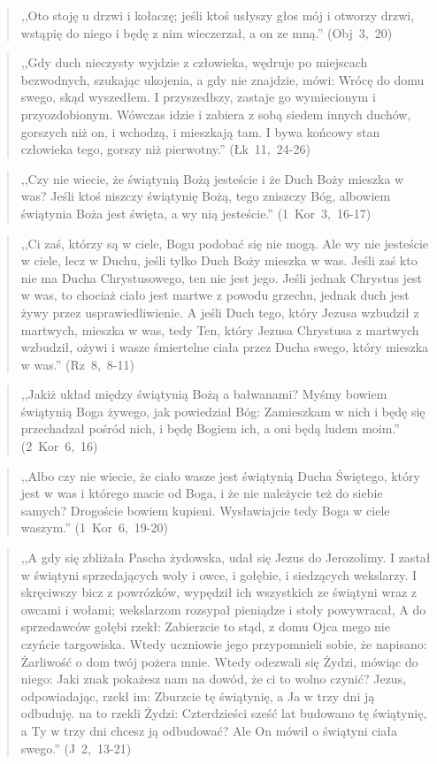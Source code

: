 \documentclass[10pt,a4paper,oneside]{article}
\begin{document}
\begin{quote}
,,Oto stoję u drzwi i kołaczę; jeśli ktoś usłyszy głos mój i otworzy drzwi, wstąpię do niego i będę z nim wieczerzał, a on ze mną.'' \mbox{(Obj 3, 20)}
\end{quote}
\begin{quote}
,,Gdy duch nieczysty wyjdzie z człowieka, wędruje po miejscach bezwodnych, szukając ukojenia, a gdy nie znajdzie, mówi: Wrócę do domu swego, skąd wyszedłem. I przyszedłszy, zastaje go wymiecionym i przyozdobionym. Wówczas idzie i zabiera z sobą siedem innych duchów, gorszych niż on, i wchodzą, i mieszkają tam. I bywa końcowy stan człowieka tego, gorszy niż pierwotny.'' \mbox{(Łk 11, 24-26)}
\end{quote}
\begin{quote}
,,Czy nie wiecie, że świątynią Bożą jesteście i że Duch Boży mieszka w was? Jeśli ktoś niszczy świątynię Bożą, tego zniszczy Bóg, albowiem świątynia Boża jest święta, a wy nią jesteście.'' \mbox{(1 Kor 3, 16-17)}
\end{quote}
\begin{quote}
,,Ci zaś, którzy są w ciele, Bogu podobać się nie mogą. Ale wy nie jesteście w ciele, lecz w Duchu, jeśli tylko Duch Boży mieszka w was. Jeśli zaś kto nie ma Ducha Chrystusowego, ten nie jest jego. Jeśli jednak Chrystus jest w was, to chociaż ciało jest martwe z powodu grzechu, jednak duch jest żywy przez usprawiedliwienie. A jeśli Duch tego, który Jezusa wzbudził z martwych, mieszka w was, tedy Ten, który Jezusa Chrystusa z martwych wzbudził, ożywi i wasze śmiertelne ciała przez Ducha swego, który mieszka w was.'' \mbox{(Rz 8, 8-11)}
\end{quote}
\begin{quote}
,,Jakiż układ między świątynią Bożą a bałwanami? Myśmy bowiem świątynią Boga żywego, jak powiedział Bóg: Zamieszkam w nich i będę się przechadzał pośród nich, i będę Bogiem ich, a oni będą ludem moim.'' \mbox{(2 Kor 6, 16)}
\end{quote}
\begin{quote}
,,Albo czy nie wiecie, że ciało wasze jest świątynią Ducha Świętego, który jest w was i którego macie od Boga, i że nie należycie też do siebie samych? Drogoście bowiem kupieni. Wysławiajcie tedy Boga w ciele waszym.'' \mbox{(1 Kor 6, 19-20)}
\end{quote}
\begin{quote}
,,A gdy się zbliżała Pascha żydowska, udał się Jezus do Jerozolimy. I zastał w świątyni sprzedających woły i owce, i gołębie, i siedzących wekslarzy. I skręciwszy bicz z powrózków, wypędził ich wszystkich ze świątyni wraz z owcami i wołami; wekslarzom rozsypał pieniądze i stoły powywracał, A do sprzedawców gołębi rzekł: Zabierzcie to stąd, z domu Ojca mego nie czyńcie targowiska. Wtedy uczniowie jego przypomnieli sobie, że napisano: Żarliwość o dom twój pożera mnie. Wtedy odezwali się Żydzi, mówiąc do niego: Jaki znak pokażesz nam na dowód, że ci to wolno czynić? Jezus, odpowiadając, rzekł im: Zburzcie tę świątynię, a Ja w trzy dni ją odbuduję. na to rzekli Żydzi: Czterdzieści sześć lat budowano tę świątynię, a Ty w trzy dni chcesz ją odbudować? Ale On mówił o świątyni ciała swego.'' \mbox{(J 2, 13-21)}
\end{quote}
\end{document}
